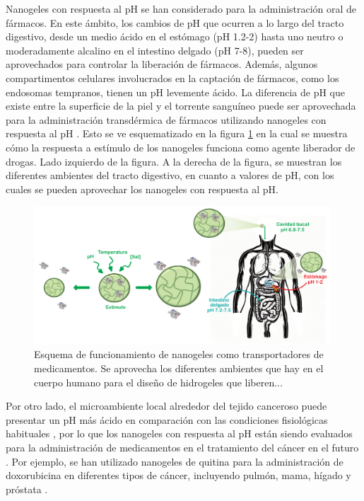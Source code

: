 Nanogeles con respuesta al pH se han considerado para la administraci\'on oral de f\'armacos. En este \'ambito, los cambios de pH que ocurren a lo largo del tracto digestivo, desde un medio \'acido en el est\'omago (pH 1.2-2) hasta uno neutro o moderadamente alcalino en el intestino delgado (pH 7-8), pueden ser aprovechados para controlar la liberaci\'on de f\'armacos.
Adem\'as, algunos compartimentos celulares involucrados en la captaci\'on de f\'armacos, como los endosomas tempranos, tienen un pH levemente \'acido. La diferencia de pH que existe entre la superficie de la piel y el torrente sangu\'ineo puede ser aprovechada para la administraci\'on transd\'ermica de f\'armacos utilizando nanogeles con respuesta al pH \cite{qindeel2019development}.
Esto se ve esquematizado en la figura \ref{fig:intro:sistema} en la cual se muestra c\'omo la respuesta a est\'imulo de los nanogeles funciona como agente liberador de drogas. Lado izquierdo de la figura.
A la derecha de la figura, se muestran los diferentes ambientes del tracto digestivo, en cuanto a valores de pH, con los cuales se pueden aprovechar los nanogeles con respuesta al pH.


\begin{figure}
	\centering
	\includegraphics[width=0.99\textwidth]{Figures/modelos/sistema.pdf}
	\caption{Esquema de funcionamiento de nanogeles como transportadores de medicamentos. Se aprovecha los diferentes ambientes que hay en el cuerpo humano para el dise\~no de hidrogeles que liberen... }
	\label{fig:intro:sistema}
\end{figure}

Por otro lado, el microambiente local alrededor del tejido canceroso puede presentar un pH m\'as \'acido en comparaci\'on con las condiciones fisiol\'ogicas habituales \cite{lawson1963breast,tannock1989acid,gerweck2006tumor}, por lo que los nanogeles con respuesta al pH est\'an siendo evaluados para la administraci\'on de medicamentos en el tratamiento del c\'ancer en el futuro \cite{peng2013controlled,kanamala2016mechanisms}. Por ejemplo, se han utilizado nanogeles de quitina para la administraci\'on de doxorubicina en diferentes tipos de c\'ancer, incluyendo pulm\'on, mama, h\'igado y pr\'ostata \cite{jayakumar2012doxorubicin}.

